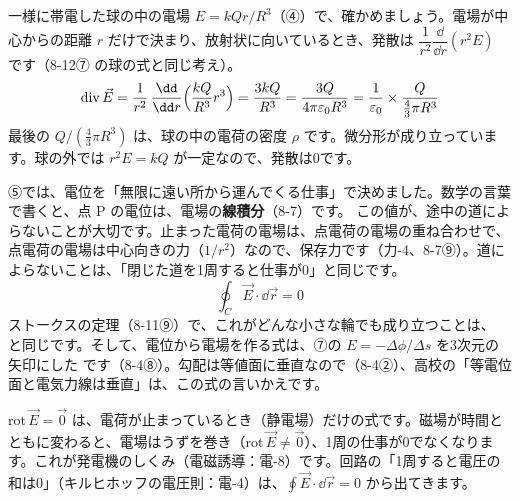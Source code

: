 \noindent 一様に帯電した球の中の電場 $E=kQr/R^3$（④）で、確かめましょう。電場が中心からの距離 $r$ だけで決まり、放射状に向いているとき、発散は $\dfrac{1}{r^2}\dfrac{\dd}{\dd r}(r^2E)$ です（8-12⑦ の球の式と同じ考え）。
\[\mathrm{div}\,\vec E=\frac{1}{r^2}\,\frac{\dd}{\dd r}\Bigl(\frac{kQ}{R^3}r^3\Bigr)=\frac{3kQ}{R^3}=\frac{3Q}{4\pi\varepsilon_0R^3}=\frac{1}{\varepsilon_0}\times\frac{Q}{\frac43\pi R^3}\]
最後の $Q/(\tfrac43\pi R^3)$ は、球の中の電荷の密度 $\rho$ です。微分形が成り立っています。球の外では $r^2E=kQ$ が一定なので、発散は0です。

\label{ph:電-2:sec9}
⑤では、電位を「無限に遠い所から運んでくる仕事」で決めました。数学の言葉で書くと、点 P の電位は、電場の\textbf{線積分}（8-7）です。
この値が、途中の道によらないことが大切です。止まった電荷の電場は、点電荷の電場の重ね合わせで、点電荷の電場は中心向きの力（$1/r^2$）なので、保存力です（力-4、8-7⑨）。道によらないことは、「閉じた道を1周すると仕事が0」と同じです。
\[\oint_C\vec E\cdot\dd\vec r=0\]
ストークスの定理（8-11⑨）で、これがどんな小さな輪でも成り立つことは、
と同じです。そして、電位から電場を作る式は、⑦の $E=-\Delta\phi/\Delta s$ を3次元の矢印にした
\label{ph:電-2:grad}です（8-4⑧）。勾配は等値面に垂直なので（8-4②）、高校の「等電位面と電気力線は垂直」は、この式の言いかえです。

\begin{phflow}[電位と電場]
\end{phflow}

\begin{seikaku}
$\mathrm{rot}\,\vec E=\vec0$ は、電荷が止まっているとき（静電場）だけの式です。磁場が時間とともに変わると、電場はうずを巻き（$\mathrm{rot}\,\vec E\neq\vec0$）、1周の仕事が0でなくなります。これが発電機のしくみ（電磁誘導：電-8）です。回路の「1周すると電圧の和は0」（キルヒホッフの電圧則：電-4）は、$\oint\vec E\cdot\dd\vec r=0$ から出てきます。
\end{seikaku}


